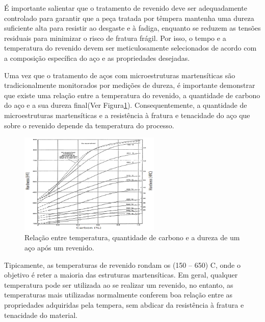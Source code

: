 \par
É importante salientar que o tratamento de revenido deve ser adequadamente controlado para garantir que a peça tratada por têmpera mantenha uma dureza suficiente alta para resistir ao desgaste e à fadiga, enquanto se reduzem as tensões residuais para minimizar o risco de fratura frágil. Por isso, o tempo e a temperatura do revenido devem ser meticulosamente selecionados de acordo com a composição específica do aço e as propriedades desejadas.
\par
Uma vez que o tratamento de aços com microestruturas martensíticas são tradicionalmente monitorados por medições de dureza, é importante demonstrar que existe uma relação entre a temperatura do revenido, a quantidade de carbono do aço e a sua dureza final(Ver Figura\ref{fig:Hardness_Temperature_Carbon}). Consequentemente, a quantidade de microestruturas martensíticas e a resistência à fratura e tenacidade do aço que sobre o revenido depende da temperatura do processo.
\begin{figure}[htb]
    \centering
    \includegraphics[width = 0.6\textwidth]{Figures/Cap2/Hardness_Temperature_Carbon.png}
    \caption[Relação Revenido: Dureza x Temperatura]%
    {Relação entre temperatura, quantidade de carbono e a dureza de um aço após um revenido\cite{Krauss2001}.}
    \label{fig:Hardness_Temperature_Carbon}
\end{figure}
\par
Tipicamente, as temperaturas de revenido rondam os (150 – 650) \textdegree C, onde o objetivo é reter a maioria das estruturas martensíticas. Em geral, qualquer temperatura pode ser utilizada ao se realizar um revenido, no entanto, as temperaturas mais utilizadas normalmente conferem boa relação entre as propriedades adquiridas pela tempera, sem abdicar da resistência à fratura e tenacidade do material.
